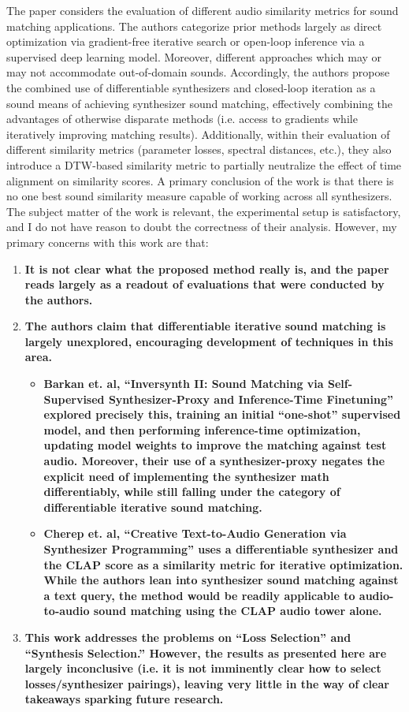 \documentclass[11pt]{article}
\begin{document}
\noindent
The paper considers the evaluation of different audio similarity metrics for sound matching applications.  The authors categorize prior methods largely as direct optimization via gradient-free iterative search or open-loop inference via a supervised deep learning model.  Moreover, different approaches which may or may not accommodate out-of-domain sounds.  Accordingly, the authors propose the combined use of differentiable synthesizers and closed-loop iteration as a sound means of achieving synthesizer sound matching, effectively combining the advantages of otherwise disparate methods (i.e. access to gradients while iteratively improving matching results).  Additionally, within their evaluation of different similarity metrics (parameter losses, spectral distances, etc.), they also introduce a DTW-based similarity metric to partially neutralize the effect of time alignment on similarity scores.  A primary conclusion of the work is that there is no one best sound similarity measure capable of working across all synthesizers.  \\
The subject matter of the work is relevant, the experimental setup is satisfactory, and I do not have reason to doubt the correctness of their analysis.  However, my primary concerns with this work are that:  
\begin{enumerate}
  \item \textbf{It is not clear what the proposed method really is, and the paper reads largely as a readout of evaluations that were conducted by the authors.}  
  \item \textbf{The authors claim that differentiable iterative sound matching is largely unexplored, encouraging development of techniques in this area.}  
    \begin{itemize}
      \item \textbf{Barkan et. al, ``Inversynth II: Sound Matching via Self-Supervised Synthesizer-Proxy and Inference-Time Finetuning'' explored precisely this, training an initial ``one-shot'' supervised model, and then performing inference-time optimization, updating model weights to improve the matching against test audio.  Moreover, their use of a synthesizer-proxy negates the explicit need of implementing the synthesizer math differentiably, while still falling under the category of differentiable iterative sound matching.}  
      \item \textbf{Cherep et. al, ``Creative Text-to-Audio Generation via Synthesizer Programming'' uses a differentiable synthesizer and the CLAP score as a similarity metric for iterative optimization.  While the authors lean into synthesizer sound matching against a text query, the method would be readily applicable to audio-to-audio sound matching using the CLAP audio tower alone.}  
    \end{itemize}
  \item \textbf{This work addresses the problems on ``Loss Selection'' and ``Synthesis Selection.''  However, the results as presented here are largely inconclusive (i.e. it is not imminently clear how to select losses/synthesizer pairings), leaving very little in the way of clear takeaways sparking future research.}
\end{enumerate}
\end{document}
